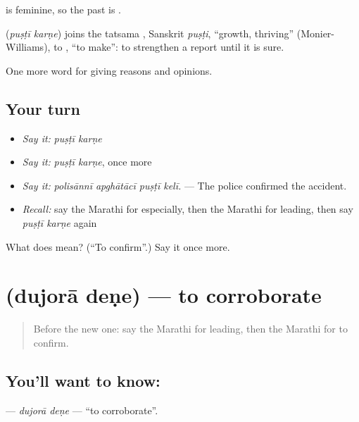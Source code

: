  is feminine, so the past is .

\begin{cousinweb}
\textbf{ } (\emph{puṣṭī karṇe}) joins the tatsama , Sanskrit \emph{puṣṭi}, \textquotedblleft{}growth, thriving\textquotedblright{} (Monier-Williams), to , \textquotedblleft{}to make\textquotedblright{}: to strengthen a report until it is sure.
\end{cousinweb}

\begin{grammarlens}[title={What you've built}]
One more word for giving reasons and opinions.
\end{grammarlens}

\subsection*{Your turn}
\begin{itemize}
\raggedright
  \item \emph{Say it:} \emph{puṣṭī karṇe}
  \item \emph{Say it:} \emph{puṣṭī karṇe}, once more
  \item \emph{Say it:} \emph{polisānnī apghātācī puṣṭī kelī.} — The police confirmed the accident.
  \item \emph{Recall:} say the Marathi for especially, then the Marathi for leading, then say \emph{puṣṭī karṇe} again
\end{itemize}

\begin{tcolorbox}[breakable,colback=teal!4,colframe=teal!35!black,title={Before you move on}]
What does   mean? (\textquotedblleft{}To confirm\textquotedblright{}.) Say it once more.
\end{tcolorbox}
\section[\texorpdfstring{\mr{दुजोरा} \mr{देणे} (dujorā deṇe)}{दुजोरा देणे (dujorā deṇe)}]{  (dujorā deṇe) — to corroborate}

\label{lesson:MR-C353-dujora-dene}



\begin{quote}
Before the new one: say the Marathi for leading, then the Marathi for to confirm.
\end{quote}

\subsection*{You'll want to know:  }
\textbf{ } — \emph{dujorā deṇe} — \textquotedblleft{}to corroborate\textquotedblright{}.

